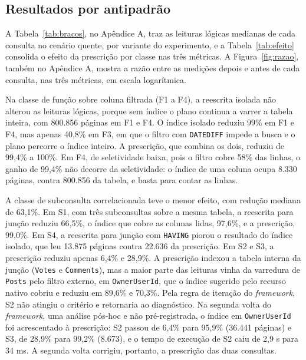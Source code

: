 \subsection{Resultados por antipadrão}\label{sec:resultados-antipadrao}

A Tabela~\ref{tab:bracos}, no Apêndice A, traz as leituras lógicas medianas de cada consulta no cenário quente, por variante do experimento, e a Tabela~\ref{tab:efeito} consolida o efeito da prescrição por classe nas três métricas. A Figura~\ref{fig:razao}, também no Apêndice A, mostra a razão entre as medições depois e antes de cada consulta, nas três métricas, em escala logarítmica.

Na classe de função sobre coluna filtrada (F1 a F4), a reescrita isolada não alterou as leituras lógicas, porque sem índice o plano continua a varrer a tabela inteira, com 800.856 páginas em F1 e F4. O índice isolado reduziu 99\% em F1 e F4, mas apenas 40,8\% em F3, em que o filtro com \texttt{DATEDIFF} impede a busca e o plano percorre o índice inteiro. A prescrição, que combina os dois, reduziu de 99,4\% a 100\%. Em F4, de seletividade baixa, pois o filtro cobre 58\% das linhas, o ganho de 99,4\% não decorre da seletividade: o índice de uma coluna ocupa 8.330 páginas, contra 800.856 da tabela, e basta para contar as linhas.

A classe de subconsulta correlacionada teve o menor efeito, com redução mediana de 63,1\%. Em S1, com três subconsultas sobre a mesma tabela, a reescrita para junção reduziu 66,5\%, o índice que cobre as colunas lidas, 97,6\%, e a prescrição, 99,0\%. Em S4, a reescrita para junção com \texttt{HAVING} piorou o resultado do índice isolado, que leu 13.875 páginas contra 22.636 da prescrição. Em S2 e S3, a prescrição reduziu apenas 6,4\% e 28,9\%. A prescrição indexou a tabela interna da junção (\texttt{Votes} e \texttt{Comments}), mas a maior parte das leituras vinha da varredura de \texttt{Posts} pelo filtro externo, em \texttt{OwnerUserId}, que o índice sugerido pelo recurso nativo cobriu e reduziu em 89,6\% e 70,3\%. Pela regra de iteração do \textit{framework}, S2 não atingiu o critério e retornaria ao diagnóstico. Na segunda volta do \textit{framework}, uma análise pós-hoc e não pré-registrada, o índice em \texttt{OwnerUserId} foi acrescentado à prescrição: S2 passou de 6,4\% para 95,9\% (36.441 páginas) e S3, de 28,9\% para 99,2\% (8.673), e o tempo de execução de S2 caiu de 2,9 s para 34 ms. A segunda volta corrigiu, portanto, a prescrição das duas consultas.

